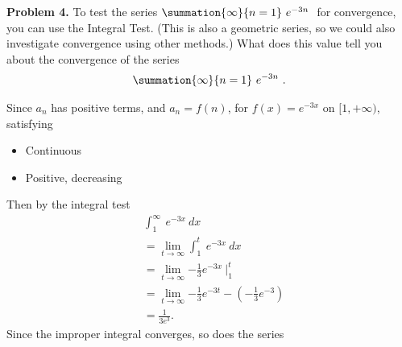 \documentclass{report}
\begin{document}
   \pagebreak \bigbreak \noindent 
   \begin{mdframed}
      \textbf{Problem 4.} To test the series  $\summation{\infty}{n=1}\ e^{-3n}\ $ for convergence, you can use the Integral Test. (This is also a geometric series, so we could also investigate convergence using other methods.) What does this value tell you about the convergence of the series
      \begin{align*}
          \summation{\infty}{n=1}\ e^{-3n}\ 
      .\end{align*}
   \end{mdframed}
   \bigbreak \noindent 
   Since $a_{n}$ has positive terms, and $a_{n} = f(n)$, for $f(x) = e^{-3x}$ on $[1,+\infty)$, satisfying 
   \begin{itemize}
       \item Continuous 
        \item Positive, decreasing
   \end{itemize}
   Then by the integral test
   \begin{align*}
        &\int_{1}^{\infty}\ e^{-3x}\ dx      \\
        &=\lim\limits_{t \to \infty}{\int_{1}^{t}\ e^{-3x}\ dx} \\
        &=\lim\limits_{t \to \infty}{-\frac{1}{3}e^{-3x}}\ \bigg|_1^{t} \\
        &=\lim\limits_{t \to \infty}{-\frac{1}{3}e^{-3t}} - \left(-\frac{1}{3}e^{-3}\right) \\
        &=\frac{1}{3e^{3}}
   .\end{align*}
   Since the improper integral converges, so does the series
\end{document}
